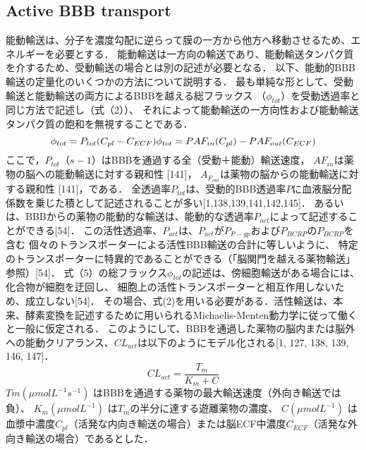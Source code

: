 \documentclass[11pt,a4paper]{jsarticle}
\begin{document}
\subsection{Active BBB transport}
能動輸送は、分子を濃度勾配に逆らって膜の一方から他方へ移動させるため、エネルギーを必要とする．
能動輸送は一方向の輸送であり、能動輸送タンパク質を介するため、受動輸送の場合とは別の記述が必要となる．
以下、能動的BBB輸送の定量化のいくつかの方法について説明する．
最も単純な形として、受動輸送と能動輸送の両方によるBBBを越える総フラックス
（$\phi_{tot}$）を受動透過率と同じ方法で記述し（式（2））、
それによって能動輸送の一方向性および能動輸送タンパク質の飽和を無視することである．
\begin{equation}
    \phi_{tot}=P_{tot}(C_{pl}-C_{ECF}) \\
    \phi_{tot}=PAF_{in}(C_{pl})-PAF_{out}(C_{ECF})
\end{equation}
ここで，$P_{tot}（s-1）$はBBBを通過する全（受動＋能動）輸送速度，
$AF_{in}$は薬物の脳への能動輸送に対する親和性 [141]，
$A_F_{out}$は薬物の脳からの能動輸送に対する親和性 [141]，である．
全透過率$P_{tot}$は、受動的BBB透過率$P$に血液脳分配係数を乗じた積として記述されることが多い[1,138,139,141,142,145]．
あるいは、BBBからの薬物の能動的な輸送は、能動的な透過率$P_{act}$によって記述することができる[54]．
この活性透過率、$P_{act}$は、$P_{act}$が$P_{P-gp}$および$P_{BCRP}$の$P_{BCRP}$を含む
個々のトランスポーターによる活性BBB輸送の合計に等しいように、
特定のトランスポーターに特異的であることができる（「脳関門を越える薬物輸送」参照）[54]．
式（5）の総フラックス$\phi_{tot}$の記述は、傍細胞輸送がある場合には、化合物が細胞を迂回し、
細胞上の活性トランスポーターと相互作用しないため、成立しない[54]．
その場合、式(2)を用いる必要がある．活性輸送は、本来、酵素変換を記述するために用いられるMichaelis-Menten動力学に従って働くと一般に仮定される．
このようにして、BBBを通過した薬物の脳内または脳外への能動クリアランス、$CL_{act}$は以下のようにモデル化される[1, 127, 138, 139, 146, 147]．
\begin{equation}
    CL_{act}=\frac{T_m}{K_m+C}
\end{equation}
$Tm(μmol L^{-1}s^{-1})$ はBBBを通過する薬物の最大輸送速度（外向き輸送では負）、
$K_m ( μmol L^{-1})$ は$T_m$の半分に達する遊離薬物の濃度、
$C(μmol L^{-1})$ は血漿中濃度$C_{pl}$（活発な内向き輸送の場合）または脳ECF中濃度$C_{ECF}$（活発な外向き輸送の場合）であるとした．
\end{document}
